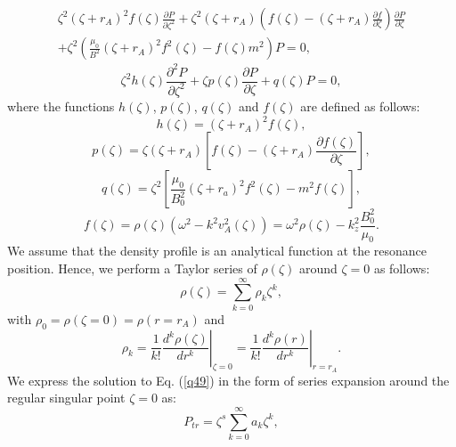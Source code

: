 \documentclass[12pt,a4paper,twoside]{article}
\begin{document}
\begin{equation}
\begin{split}
\zeta^2 (\zeta + r_A)^2 f(\zeta) \frac{\partial P}{\partial \zeta^2}+ \zeta^2 (\zeta + r_A) \left( f(\zeta) - (\zeta + r_A) \frac{\partial f}{\partial \zeta} \right) \frac{\partial P}{\partial \zeta} \\ + \zeta^2 \left( \frac{\mu_0}{B^2} (\zeta + r_A)^2 f^2(\zeta) - f(\zeta)m^2 \right)P = 0 , 
\end{split}
\end{equation}
\begin{equation}\label{q49}
\zeta^2 h(\zeta) \frac{\partial^2 P}{\partial \zeta^2} + \zeta p(\zeta) \frac{\partial P}{\partial \zeta} + q(\zeta)P = 0 ,
\end{equation} 
where the functions $h(\zeta)$, $p(\zeta)$, $q(\zeta)$ and $f(\zeta)$ are defined as follows:
\begin{equation}
h(\zeta) = (\zeta+r_A)^2 f(\zeta) ,
\end{equation}
\begin{equation}
p(\zeta) = \zeta (\zeta+r_A) \left[ f(\zeta) - (\zeta+r_A) \frac{\partial f(\zeta)}{\partial \zeta}  \right] ,
\end{equation}
\begin{equation}
q(\zeta) = \zeta^2 \left[ \frac{\mu_0}{B_0^2} (\zeta+r_a)^2 f^2(\zeta) - m^2 f(\zeta) \right] ,
\end{equation}
\begin{equation} \label{n14}
f(\zeta) = \rho(\zeta)(\omega^2-k^2 v^2_A(\zeta))= \omega^2 \rho(\zeta) - k^2_z \frac{B_0^2}{\mu_0} .
\end{equation}
We assume that the density profile is an analytical function at the resonance position. Hence, we perform a Taylor series of $\rho (\zeta)$ around $\zeta=0$ as follows:
\begin{equation}\label{n24}
\rho(\zeta)=\sum_{k=0}^{\infty} \rho_k \zeta^k ,
\end{equation}
with $\rho_0=\rho(\zeta=0)=\rho(r=r_A)$ and
\begin{equation}\label{q47}
\rho_k = \left. \frac{1}{k!} \frac{d^k \rho(\zeta)}{dr^k} \right|_{\zeta=0} = \left. \frac{1}{k!} \frac{d^k \rho(r)}{dr^k} \right|_{r=r_A} .
\end{equation}
We express the solution to Eq. (\ref{q49}) in the form of series expansion around the regular singular point $\zeta=0$ as:
\begin{equation}\label{q48}
P_{tr} = \zeta^s \sum^{\infty}_{k=0} a_k \zeta^k ,
\end{equation} 
\end{document}
